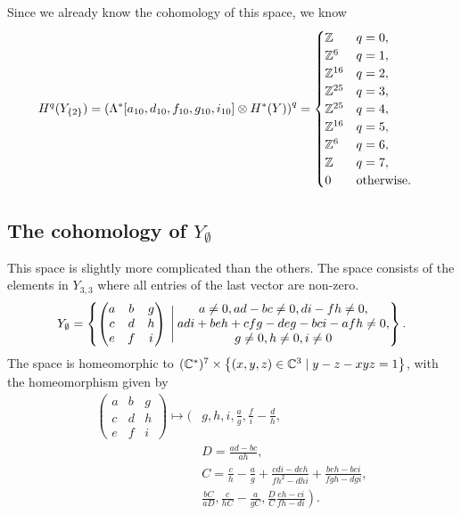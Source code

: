 Since we already know the cohomology of this space, we know
\begin{align*}
  H^q(Y_{\left\{ 2 \right\}}) = 
  \left(\Lambda^*[a_{10},d_{10},f_{10},g_{10},i_{10}]\otimes
  H^*(Y)\right)^q &=
  \begin{cases}
    \mathbb{Z} & q = 0, \\
    \mathbb{Z}^6 & q = 1, \\
    \mathbb{Z}^{16} & q = 2, \\
    \mathbb{Z}^{25} & q = 3, \\
    \mathbb{Z}^{25} & q = 4, \\
    \mathbb{Z}^{16} & q = 5, \\
    \mathbb{Z}^6 & q = 6, \\
    \mathbb{Z} & q = 7, \\
    0 & \text{otherwise}.
  \end{cases}
\end{align*}

\subsection{The cohomology of $Y_{\emptyset}$}

This space is slightly more complicated than the others. The space
consists of the elements in $Y_{3,3}$ where all entries of the last
vector are non-zero.
\[ Y_{\emptyset} = \left\{ 
  \begin{pmatrix}
    a & b & g \\
    c & d & h \\
    e & f & i
  \end{pmatrix} \:\Bigg\vert\:
  \begin{matrix}
    a \neq 0, ad-bc \neq 0, di-fh \neq 0, \\
    adi+beh+cfg-deg-bci-afh \neq 0, \\
    g\neq 0, h\neq 0, i\neq 0
  \end{matrix}  \right\}. \]
The space is homeomorphic to $(\mathbb{C}^*)^7\times \left\{  (x,y,z)\in \mathbb{C}^3
  \mid y-z-xyz = 1 \right\}$, with the homeomorphism given by
\begin{align*}
  \begin{pmatrix}
    a & b & g \\
    c & d & h \\
    e & f & i
  \end{pmatrix} \mapsto \bigg(&g, h, i, \frac{a}{g},
    \frac{f}{i}-\frac{d}{h},\\
  &D=\frac{ad-bc}{ah}, \\
  &C=\frac{c}{h}-\frac{a}{g}+\frac{cdi-deh}{fh^2-dhi} +
  \frac{beh-bci}{fgh-dgi},\\
  &\left.\frac{bC}{aD},\frac{c}{hC}-\frac{a}{gC},
    \frac{D}{C}\frac{eh-ci}{fh-di}\right).
\end{align*}

